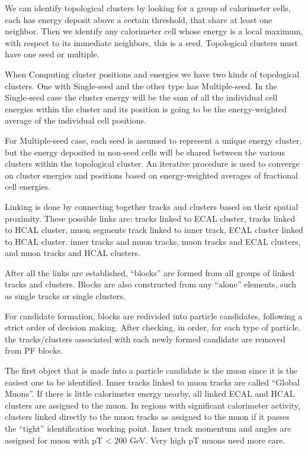 We can identify topological clusters by looking for a group of calorimeter cells, each has energy deposit above a certain threshold, that share at least one neighbor. Then we identify any calorimeter cell whose energy is a local maximum, with respect to its immediate neighbors, this is a seed. Topological clusters must have one seed or multiple.

When Computing cluster positions and energies we have two kinds of topological clusters. One with Single-seed and the other type has Multiple-seed. In the Single-seed case the cluster energy will be the sum of all the individual cell energies within the cluster and its position is going to be the energy-weighted average of the individual cell positions.

For Multiple-seed case, each seed is assumed to represent a unique energy cluster, but the energy deposited in non-seed cells will be shared between the various clusters within the topological cluster.  An iterative procedure is used to converge on cluster energies and positions based on energy-weighted averages of fractional cell energies.

Linking is done by connecting together tracks and clusters based on their spatial proximity. These possible links are: tracks linked to ECAL cluster, tracks linked to HCAL cluster, muon segments track linked to inner track, ECAL cluster linked to HCAL cluster. inner tracks and muon tracks, muon tracks and ECAL clusters, and muon tracks and HCAL clusters.

After all the links are established, “blocks” are formed from all groups of linked tracks and clusters. Blocks are also constructed from any “alone” elements, such as single tracks or single clusters.

For candidate formation, blocks are redivided into particle candidates, following a strict order of decision making. After checking, in order, for each type of particle. the tracks/clusters associated with each newly formed candidate are removed from PF blocks.


The first object that is made into a particle candidate is the muon since it is the easiest one to be identified. Inner tracks linked to muon tracks are called “Global Muons”. If there is little calorimeter energy nearby, all linked ECAL and HCAL clusters are assigned to the muon. In regions with significant calorimeter activity, clusters linked directly to the muon tracks as assigned to the muon if it passes the “tight” identification working point. Inner track momentum and angles are assigned for muon with pT < 200 GeV. Very high pT muons need more care.

